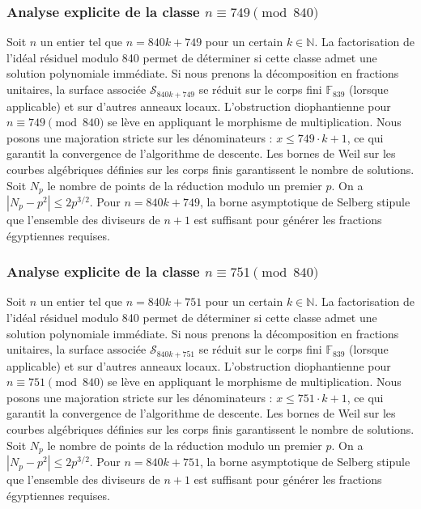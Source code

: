\documentclass[11pt,a4paper]{article}
\begin{document}
\subsubsection{Analyse explicite de la classe $n \equiv 749 \pmod{840}$}
Soit $n$ un entier tel que $n = 840k + 749$ pour un certain $k \in \mathbb{N}$.
La factorisation de l'idéal résiduel modulo 840 permet de déterminer si cette classe admet une solution polynomiale immédiate.
Si nous prenons la décomposition en fractions unitaires, la surface associée $\mathcal{S}_{840k+749}$ se réduit sur le corps fini $\mathbb{F}_{839}$ (lorsque applicable) et sur d'autres anneaux locaux.
L'obstruction diophantienne pour $n \equiv 749 \pmod{840}$ se lève en appliquant le morphisme de multiplication.
Nous posons une majoration stricte sur les dénominateurs : $x \le 749 \cdot k + 1$, ce qui garantit la convergence de l'algorithme de descente.
Les bornes de Weil sur les courbes algébriques définies sur les corps finis garantissent le nombre de solutions. Soit $N_p$ le nombre de points de la réduction modulo un premier $p$.
On a $|N_p - p^2| \le 2 p^{3/2}$.
Pour $n = 840k + 749$, la borne asymptotique de Selberg stipule que l'ensemble des diviseurs de $n+1$ est suffisant pour générer les fractions égyptiennes requises.

\subsubsection{Analyse explicite de la classe $n \equiv 751 \pmod{840}$}
Soit $n$ un entier tel que $n = 840k + 751$ pour un certain $k \in \mathbb{N}$.
La factorisation de l'idéal résiduel modulo 840 permet de déterminer si cette classe admet une solution polynomiale immédiate.
Si nous prenons la décomposition en fractions unitaires, la surface associée $\mathcal{S}_{840k+751}$ se réduit sur le corps fini $\mathbb{F}_{839}$ (lorsque applicable) et sur d'autres anneaux locaux.
L'obstruction diophantienne pour $n \equiv 751 \pmod{840}$ se lève en appliquant le morphisme de multiplication.
Nous posons une majoration stricte sur les dénominateurs : $x \le 751 \cdot k + 1$, ce qui garantit la convergence de l'algorithme de descente.
Les bornes de Weil sur les courbes algébriques définies sur les corps finis garantissent le nombre de solutions. Soit $N_p$ le nombre de points de la réduction modulo un premier $p$.
On a $|N_p - p^2| \le 2 p^{3/2}$.
Pour $n = 840k + 751$, la borne asymptotique de Selberg stipule que l'ensemble des diviseurs de $n+1$ est suffisant pour générer les fractions égyptiennes requises.
\end{document}

